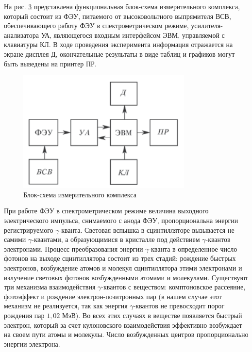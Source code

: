 \documentclass[a4paper,12pt]{article}
\begin{document}
На рис. \hyperref[fig: Measuring complex]{3} представлена функциональная блок-схема измерительного комплекса, который состоит из ФЭУ, питаемого от высоковольтного выпрямителя ВСВ, обеспечивающего работу ФЭУ в спектрометрическом режиме, усилителя-анализатора УА, являющегося входным интерфейсом ЭВМ, управляемой с клавиатуры КЛ. В ходе проведения эксперимента информация отражается на экране дисплея Д, окончательные результаты в виде таблиц и графиков могут быть выведены на принтер ПР.

\begin{figure}\label{fig: Measuring complex}
    \begin{center}
    \vspace{-20pt}
        \includegraphics[width = 0.78\textwidth]{Measuring complex.png}
    \end{center}
    \caption{Блок-схема измерительного комплекса}
\end{figure}
При работе ФЭУ в спектрометрическом режиме величина выходного электрического импульса, снимаемого с анода ФЭУ, пропорциональна энергии регистрируемого $\gamma$-кванта. Световая вспышка в сцинтилляторе вызывается не самими $\gamma$-квантами, а образующимися в кристалле под действием $\gamma$-квантов электронами. Процесс преобразования энергии $\gamma$-кванта в определенное число фотонов на выходе сцинтиллятора состоит из трех стадий: рождение быстрых электронов, возбуждение атомов и молекул сцинтиллятора этими электронами и излучение световых фотонов возбужденными атомами и молекулами. Существуют три механизма взаимодействия $\gamma$-квантов с веществом: комптоновское рассеяние, фотоэффект и рождение электрон-позитронных пар (в нашем случае этот механизм не реализуется, так как энергия $\gamma$-квантов не превосходит порог рождения пар $1,02$ МэВ). Во всех этих случаях в веществе появляется быстрый электрон, который за счет кулоновского взаимодействия эффективно возбуждает на своем пути атомы и молекулы. Число возбужденных центров пропорционально энергии электрона.
\end{document}

